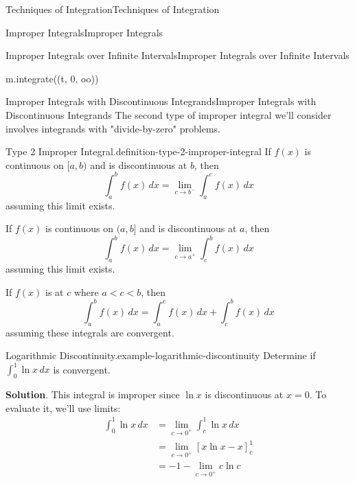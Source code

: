 \documentclass[10pt,]{book}
\numberwithin{equation}{section}
\newcommand{\lt}{<}
\begin{document}
\begin{chapterptx}{Techniques of Integration}{}{Techniques of Integration}{}{}
\begin{sectionptx}{Improper Integrals}{}{Improper Integrals}{}{}
\begin{subsectionptx}{Improper Integrals over Infinite Intervals}{}{Improper Integrals over Infinite Intervals}{}{}
\begin{sageinput}
m.integrate((t, 0, oo))
\end{sageinput}
\end{subsectionptx}
%
%
\typeout{************************************************}
\typeout{************************************************}
%
\begin{subsectionptx}{Improper Integrals with Discontinuous Integrands}{}{Improper Integrals with Discontinuous Integrands}{}{}\label{subsection-improper-integrals-with-discontinuous-integrands}
\hypertarget{p-594}{}%
The second type of improper integral we'll consider involves integrands with "divide-by-zero" problems.%
\begin{definition}{Type 2 Improper Integral.}{definition-type-2-improper-integral}%
\hypertarget{p-595}{}%
If \(f(x)\) is continuous on \([a,b)\) and is discontinuous at \(b\), then%
\begin{equation*}
\int_{a}^{b}f(x)\,dx = \lim_{c\to b^{-}}\int_{a}^{c}f(x)\,dx
\end{equation*}
assuming this limit exists.%
\par
\hypertarget{p-596}{}%
If \(f(x)\) is continuous on \((a,b]\) and is discontinuous at \(a\), then%
\begin{equation*}
\int_{a}^{b}f(x)\,dx = \lim_{c\to a^{+}}\int_{c}^{b}f(x)\,dx
\end{equation*}
assuming this limit exists.%
\par
\hypertarget{p-597}{}%
If \(f(x)\) is at \(c\) where \(a \lt c\lt b\), then%
\begin{equation*}
\int_{a}^{b}f(x)\,dx = \int_{a}^{c}f(x)\,dx + \int_{c}^{b}f(x)\,dx
\end{equation*}
assuming these integrals are convergent.%
\end{definition}
\begin{example}{Logarithmic Discontinuity.}{example-logarithmic-discontinuity}%
\hypertarget{p-598}{}%
Determine if \(\int_{0}^{1}\ln x\,dx\) is convergent.%
\par\smallskip%
\noindent\textbf{Solution}.\hypertarget{solution-129}{}\quad%
\hypertarget{p-599}{}%
This integral is improper since \(\ln x\) is discontinuous at \(x = 0\). To evaluate it, we'll use limits:%
\begin{align*}
\int_{0}^{1}\ln x\,dx & = \lim_{c\to0^{+}}\int_{c}^{1}\ln x\,dx \\
& = \lim_{c\to0^{+}}\left[x\ln x - x\right]_{c}^{1} \\
& = -1 - \lim_{c\to0^{+}}c\ln c \\

\end{align*}
\end{example}
\end{subsectionptx}
\end{sectionptx}
\end{chapterptx}
\end{document}

